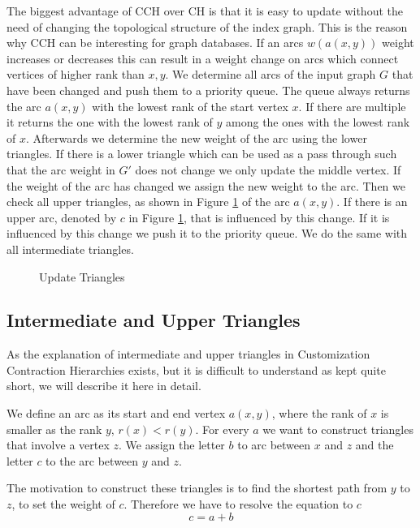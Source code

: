 The biggest advantage of CCH over CH is that it is easy to update without the need of changing the topological structure of the index graph.
This is the reason why CCH can be interesting for graph databases.
If an arcs $w(a(x, y))$ weight increases or decreases this can result in a weight change on arcs which connect vertices of higher rank than $x, y$.
We determine all arcs of the input graph $G$ that have been changed and push them to a priority queue.
The queue always returns the arc $a(x,y)$ with the lowest rank of the start vertex $x$.
If there are multiple it returns the one with the lowest rank of $y$ among the ones with the lowest rank of $x$.
Afterwards we determine the new weight of the arc using the lower triangles.
If there is a lower triangle which can be used as a pass through such that the arc weight in $G'$ does not change we only update the middle vertex.
If the weight of the arc has changed we assign the new weight to the arc.
Then we check all upper triangles, as shown in Figure \ref{fig:updateTriangles} of the arc $a(x,y)$. 
If there is an upper arc, denoted by $c$ in Figure \ref{fig:updateTriangles}, that is influenced by this change.
If it is influenced by this change we push it to the priority queue.
We do the same with all intermediate triangles.
\\
\begin{figure}
    \centering
    
    \caption{Update Triangles}
    \label{fig:updateTriangles}
\end{figure}

\subsection{Intermediate and Upper Triangles}

As the explanation of intermediate and upper triangles in Customization Contraction Hierarchies \cite{CCH} exists, but it is difficult to understand as kept quite short, we will describe it here in detail.

We define an arc as its start and end vertex $a(x,y)$, where the rank of $x$ is smaller as the rank $y$, $r(x) < r(y)$.
For every $a$ we want to construct triangles that involve a vertex $z$.
We assign the letter $b$ to arc between $x$ and $z$ and the letter $c$ to the arc between $y$ and $z$.

The motivation to construct these triangles is to find the shortest path from $y$ to $z$, to set the weight of $c$.
Therefore we have to resolve the equation to $c$
\begin{equation*}
    c = a + b
\end{equation*}

